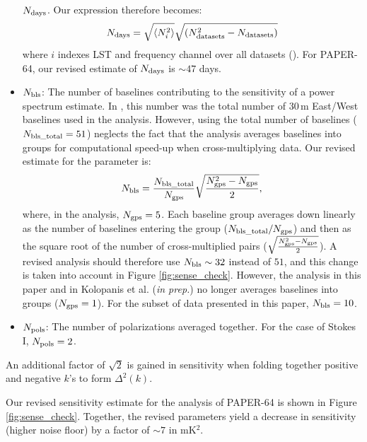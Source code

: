 \documentclass[preprint2,numberedappendix,tighten]{aastex6}  %
\begin{document}
\begin{itemize}
$N_{\rm days}$. Our expression therefore becomes:
\begin{equation}
N_{\rm days} = \sqrt{\langle N_{i}^{2}\rangle} \sqrt{(N_{\rm datasets}^{2}-N_{\rm datasets})}
 \end{equation}
\noindent where $i$ indexes LST and frequency channel over all datasets (\citealt{jacobs_et_al2015}). For PAPER-64, our revised estimate of $N_{\rm days}$ is $\sim47$ 
days.
\item $N_{\rm bls}$: The number of baselines contributing to the sensitivity of a power spectrum estimate. In , this number was 
the total number of $30$\,m East/West baselines used in the analysis. However, using the total number of baselines ($N_{\rm bls\_total} = 51$) neglects 
the fact that the  analysis averages baselines into groups for computational speed-up when cross-multiplying data. Our revised estimate for the parameter is:
\begin{equation}
N_{\rm bls} = \frac{N_{\rm bls\_total}}{N_{\rm gps}}\sqrt{\frac{N_{\rm gps}^{2}-N_{\rm gps}}{2}},
\end{equation}
\noindent where, in the  analysis, $N_{\rm gps} = 5$. Each baseline group averages down linearly as the number of baselines 
entering the group ($N_{\rm bls\_total}/N_{\rm gps}$) and then as the square root of the number of cross-multiplied pairs \Big($\sqrt{\frac{N_{\rm gps}^{2} - 
N_{\rm gps}}{2}}$\Big). A revised  analysis should therefore use $N_{\rm bls} \sim 32$ instead of $51$, and this change is taken into account in Figure \ref{fig:sense_check}. However, the analysis in this paper and in Kolopanis et al. (\textit{in prep.}) no longer averages baselines into groups ($N_{\rm gps} = 1$). For the subset of data presented in this paper, $N_{\rm bls} = 10$.
\item $N_{\rm pols}$: The number of polarizations averaged together. For the case of Stokes I, $N_{\rm pols}=2$.
\end{itemize}

An additional factor of $\sqrt{2}$ is gained in sensitivity when folding together positive and negative $k$'s to form $\Delta^{2}(k)$.

Our revised sensitivity estimate for the  analysis of PAPER-64 is shown in Figure \ref{fig:sense_check}. 
Together, the revised parameters yield a decrease in sensitivity (higher noise floor) by a factor of $\sim7$ in mK$^{2}$. 
\end{document}
